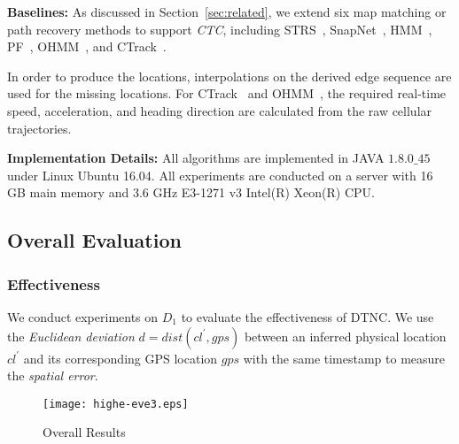 \documentclass{vldb}
\begin{document}
	\textbf{Baselines:} 
	As discussed in Section~\ref{sec:related}, %
	we extend six map matching or path recovery methods to support {\it CTC}, including STRS~\cite{DBLP:conf/kdd/WuMSZZCW16}, SnapNet~\cite{mohamed2016accurate}, HMM~\cite{raymond2012map}, PF~\cite{kempinska2016probabilistic}, OHMM~\cite{goh2012online}, and CTrack~\cite{thiagarajan2011accurate}.
	
	
	In order to produce the locations,
	interpolations on the derived edge sequence are used for the missing locations.
	For CTrack~\cite{thiagarajan2011accurate} and OHMM~\cite{goh2012online}, the required real-time speed, acceleration, and heading direction are calculated from the raw cellular trajectories. 
	
	\textbf{Implementation Details:}
	All algorithms are implemented in JAVA $1.8.0\_45$ under Linux Ubuntu 16.04.
	All experiments are conducted on a server with 16 GB main memory and 3.6 GHz E3-1271 v3 Intel(R) Xeon(R) CPU.
	
	\vspace{-4pt}
	\subsection{Overall Evaluation}
	\vspace{-4pt}
	\subsubsection{Effectiveness}
	
	We conduct experiments on $D_1$ to evaluate the effectiveness of DTNC.
	We use the {\em Euclidean deviation} $d=dist(cl^\prime, gps)$ between an inferred physical location $cl^\prime$
	and its corresponding GPS location $gps$ with the same timestamp to measure the {\em spatial error}.
			
	
	\begin{figure}[!htb]
		\centering
		\vspace{-5pt}
		\texttt{[image: highe-eve3.eps]}
		\vspace{-15pt}
		\caption{Overall Results}	\label{fig:eff-acc-varying-data}
		\vspace{-10pt}
	\end{figure}
	
\end{document}
